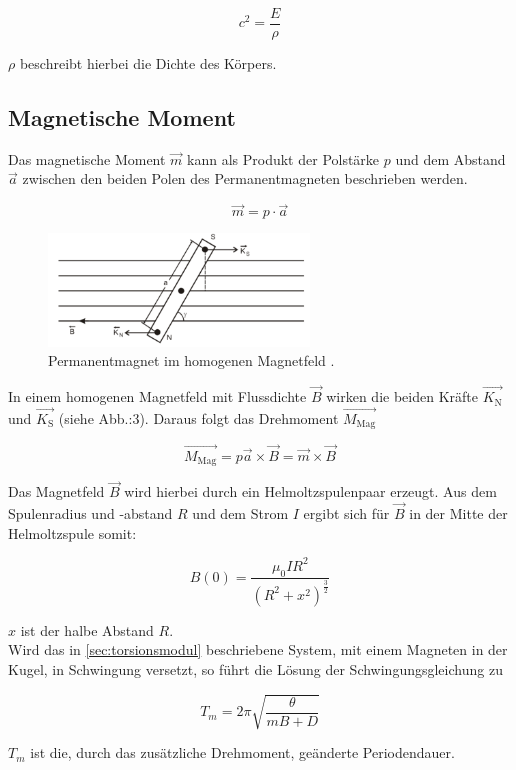 \begin{equation}
	c^2 = \frac{E}{\rho}
\end{equation}

$\rho$ beschreibt hierbei die Dichte des Körpers.

\newpage

\subsection{Magnetische Moment}

Das magnetische Moment $\vec{m}$ kann als Produkt der Polstärke $p$ und dem Abstand $\vec{a}$ zwischen den beiden Polen des Permanentmagneten beschrieben werden.

\begin{equation}
	\vec{m} = p\cdot \vec{a}
\end{equation}

\begin{figure}[h]
  \centering
  \includegraphics[height=3cm]{Grafiken/Permanentmagnet im homogenen Magnetfeld.pdf}
  \caption{Permanentmagnet im homogenen Magnetfeld \cite{1}.}
  \label{fig:Permanentmagnet}
\end{figure}

In einem homogenen Magnetfeld mit Flussdichte $\vec{B}$ wirken die beiden Kräfte $\vec{K_\text{N}}$ und $\vec{K_\text{S}}$ (siehe Abb.:3). Daraus folgt das Drehmoment $\vec{M_\text{Mag}}$

\begin{equation}
	\vec{M_\text{Mag}} = p\vec{a} \times \vec{B} = \vec{m} \times \vec{B}
\end{equation}

Das Magnetfeld $\vec{B}$ wird hierbei durch ein Helmoltzspulenpaar erzeugt. Aus dem Spulenradius und -abstand $R$ und dem Strom $I$ ergibt sich für $\vec{B}$ in der Mitte der Helmoltzspule somit:

\begin{equation}
	B(0)=\frac{\mu_0 I R^2}{(R^2+x^2)^\frac{3}{2}}
\end{equation}

$x$ ist der halbe Abstand $R$. \\

Wird das in \ref{sec:torsionsmodul} beschriebene System, mit einem Magneten in der Kugel, in Schwingung versetzt, so führt die Lösung der Schwingungsgleichung zu

\begin{equation}
	T_m = 2\pi\sqrt{\frac{\theta}{mB+D}}
\end{equation}

$T_m$ ist die, durch das zusätzliche Drehmoment, geänderte Periodendauer.



